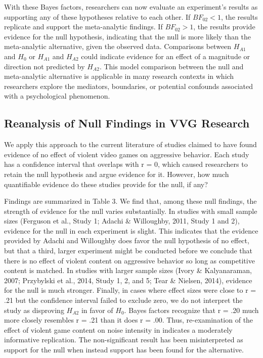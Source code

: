 \documentclass[fignum,nobf,man]{apa}
\begin{document}
With these Bayes factors, researchers can now evaluate an experiment's results as supporting any of these hypotheses relative to each other. %
If $BF_{02} < 1$, the results replicate and support the meta-analytic findings. If $BF_{02} > 1$, the results provide evidence for the null hypothesis, indicating that the null is more likely than the meta-analytic alternative, given the observed data.  Comparisons between $H_{A1}$ and $H_0$ or $H_{A1}$ and $H_{A2}$ could indicate evidence for an effect of a magnitude or direction not predicted by $H_{A2}$. This model comparison between the null and meta-analytic alternative is applicable in many research contexts in which researchers explore the mediators, boundaries, or potential confounds associated with a psychological phenomenon.

\subsection{Reanalysis of Null Findings in VVG Research}
We apply this approach to the current literature of studies claimed to have found evidence of no effect of violent video games on aggressive behavior. Each study has a confidence interval that overlaps with r = 0, which caused researchers to retain the null hypothesis and argue evidence for it. However, how much quantifiable evidence do these studies provide for the null, if any?

Findings are summarized in Table 3. We find that, among these null findings, the strength of evidence for the null varies substantially. In studies with small sample sizes (Ferguson et al., Study 1; Adachi \& Willoughby, 2011, Study 1 and 2), %
evidence for the null in each experiment is slight. This indicates that the evidence provided by Adachi and Willoughby does favor the null hypothesis of no effect, but that a third, larger experiment might be conducted before we conclude that there is no effect of violent content on aggressive behavior so long as competitive content is matched. %
In studies with larger sample sizes (Ivory \& Kalyanaraman, 2007; Przybylski et al., 2014, Study 1, 2, and 5; Tear \& Nielsen, 2014), %
evidence for the null is much stronger.	Finally, in cases where effect sizes were close to r = .21 but the confidence interval failed to exclude zero, we do not interpret the study as disproving $H_{A2}$ in favor of $H_0$. Bayes factors recognize that r = .20 much more closely resembles r = .21 than it does r = .00. Thus, re-examination of the effect of violent game content on noise intensity in \citet{Elson:etal:2013} indicates a moderately informative replication. The non-significant result has been misinterpreted as support for the null when instead support has been found for the alternative.
\end{document}
